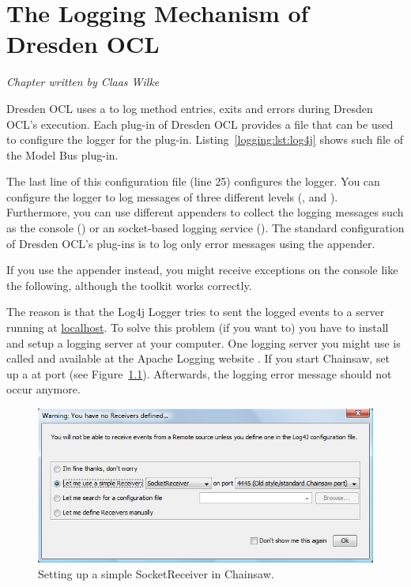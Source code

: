 \chapter{The Logging Mechanism of Dresden OCL}
\label{chapter:logging}

\begin{flushright}
\textit{Chapter written by Claas Wilke}
\end{flushright}

Dresden OCL uses a  to log method entries, exits and
errors during Dresden OCL's execution. Each plug-in of Dresden OCL provides a
 file that can be used to configure the logger for the
plug-in. Listing~\ref{logging:lst:log4j} shows such file of the Model Bus
plug-in.

\begin{figure}[!t]
  
\end{figure}

The last line of this configuration file (line 25) configures the logger. You
can configure the logger to log messages of three different levels
(,  and ). Furthermore, you can use different
appenders to collect the logging messages such as the console () or
an socket-based logging service (). The standard configuration of
Dresden OCL's plug-ins is to log only error messages using the 
appender.

If you use the  appender instead, you might
receive exceptions on the console like the following, although the toolkit 
works correctly.

\begin{center}
\end{center}

The reason is that the Log4j Logger tries to sent the logged events to a server 
running at \url{localhost}. To solve this problem (if you want to) you have to 
install and setup a logging server at your computer. One logging server you
might use is called  and available at the Apache Logging 
website \cite{WWW:chainsaw}. If you start Chainsaw, set up a 
 at port  (see Figure~\ref{pic:logging:chainsaw01}). Afterwards, the logging error 
message should not occur anymore.

\begin{figure}[!htbp]
	\centering
	\includegraphics[width=0.8\linewidth]{figures/logging/chainsaw01}
	\caption{Setting up a simple SocketReceiver in Chainsaw.}
	\label{pic:logging:chainsaw01}
\end{figure}